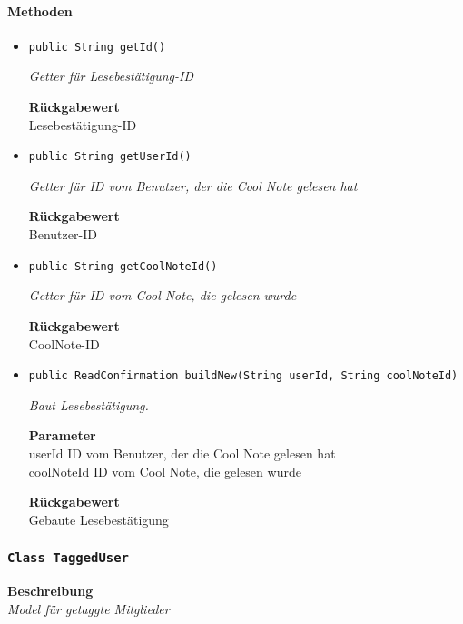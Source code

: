      \paragraph*{Methoden}
     \begin{itemize}
     	\item{\texttt{public String getId()}}
     	
     	\textit{Getter für Lesebestätigung-ID}
     	
     	
     	
     	\textbf{Rückgabewert} \\
     	Lesebestätigung-ID        \item{\texttt{public String getUserId()}}
     	
     	\textit{Getter für ID vom Benutzer, der die Cool Note gelesen hat}
     	
     	
     	
     	\textbf{Rückgabewert} \\
     	Benutzer-ID        \item{\texttt{public String getCoolNoteId()}}
     	
     	\textit{Getter für ID vom Cool Note, die gelesen wurde}
     	
     	
     	
     	\textbf{Rückgabewert} \\
     	CoolNote-ID        \item{\texttt{public ReadConfirmation buildNew(String userId, String coolNoteId)}}
     	
     	\textit{Baut Lesebestätigung.}
     	
     	\textbf{Parameter} \\
     	userId ID vom Benutzer, der die Cool Note gelesen hat\\
     	coolNoteId ID vom Cool Note, die gelesen wurde
     	
     	\textbf{Rückgabewert} \\
     	Gebaute Lesebestätigung
     \end{itemize}
     \subsubsection{\texttt{Class TaggedUser}}
     \textbf{Beschreibung} \\
     \textit{Model für getaggte Mitglieder}
